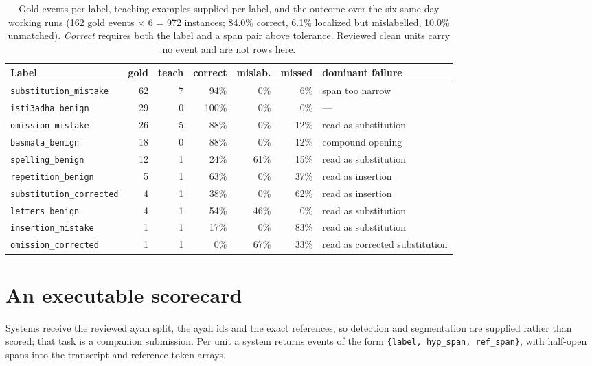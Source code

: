 \documentclass{article}
\begin{document}
\begin{table}[h]\centering\footnotesize\setlength{\tabcolsep}{4pt}
\begin{tabular}{lrrrrrl}\toprule
Label & gold & teach & correct & mislab. & missed & dominant failure\\\midrule
\texttt{substitution\_mistake}   & 62 & 7 & 94\% &  0\% &  6\% & span too narrow\\
\texttt{isti3adha\_benign}       & 29 & 0 & 100\% & 0\% &  0\% & ---\\
\texttt{omission\_mistake}       & 26 & 5 & 88\% &  0\% & 12\% & read as substitution\\
\texttt{basmala\_benign}         & 18 & 0 & 88\% &  0\% & 12\% & compound opening\\
\texttt{spelling\_benign}        & 12 & 1 & 24\% & 61\% & 15\% & read as substitution\\
\texttt{repetition\_benign}      &  5 & 1 & 63\% &  0\% & 37\% & read as insertion\\
\texttt{substitution\_corrected} &  4 & 1 & 38\% &  0\% & 62\% & read as insertion\\
\texttt{letters\_benign}         &  4 & 1 & 54\% & 46\% &  0\% & read as substitution\\
\texttt{insertion\_mistake}      &  1 & 1 & 17\% &  0\% & 83\% & read as substitution\\
\texttt{omission\_corrected}     &  1 & 1 &  0\% & 67\% & 33\% & read as corrected substitution\\
\bottomrule
\end{tabular}
\caption{Gold events per label, teaching examples supplied per label, and the outcome over the six same-day working runs (162 gold events $\times$ 6 = 972 instances; 84.0\% correct, 6.1\% localized but mislabelled, 10.0\% unmatched). \emph{Correct} requires both the label and a span pair above tolerance. Reviewed clean units carry no event and are not rows here.}
\label{tab:labels}
\end{table}

\section{An executable scorecard}
Systems receive the reviewed ayah split, the ayah ids and the exact references, so detection and segmentation are supplied rather than scored; that task is a companion submission. Per unit a system returns events of the form \texttt{\{label, hyp\_span, ref\_span\}}, with half-open spans into the transcript and reference token arrays.
\end{document}
